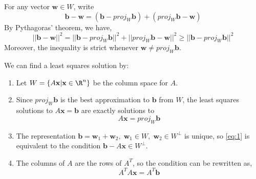 {For any vector \(\mathbf{w} \in W\), write
\begin{equation}
    \mathbf{b} - \mathbf{w} = (\mathbf{b} - proj_W\mathbf{b}) + (proj_W\mathbf{b} - \mathbf{w})
\end{equation}
By Pythagoras' theorem, we have,
\begin{equation}
    ||\mathbf{b} - \mathbf{w}||^2 = ||\mathbf{b} - proj_W\mathbf{b}||^2 + ||proj_W\mathbf{b} - \mathbf{w}||^2 \geq ||\mathbf{b} - proj_W\mathbf{b}||^2
\end{equation}
Moreover, the inequality is strict whenever \(\mathbf{w} \neq proj_W\mathbf{b}\).}

We can find a least squares solution by:
\begin{enumerate}
    \item Let \(W = \{A\mathbf{x} | \mathbf{x} \in \R^n\}\) be the column space for \(A\).
    \item Since \(proj_W\mathbf{b}\) is the best approximation to \(\mathbf{b}\) from \(W\), the least squares solutions to \(A\mathbf{x} = \mathbf{b}\) are exactly solutions to 
    \begin{equation}\label{eq:1}
        A\mathbf{x} = proj_W\mathbf{b}
    \end{equation}
    \item The representation \(\mathbf{b} = \mathbf{w}_1 + \mathbf{w}_2,\; \mathbf{w}_1 \in W,\; \mathbf{w}_2 \in W^\perp\) is unique, so \eqref{eq:1} is equivalent to the condition \(\mathbf{b} - A\mathbf{x} \in W^\perp\).
    \item The columns of \(A\) are the rows of \(A^T\), so the condition can be rewritten as,
    \begin{equation}
        A^TA\mathbf{x} = A^T\mathbf{b}
    \end{equation}
\end{enumerate}

